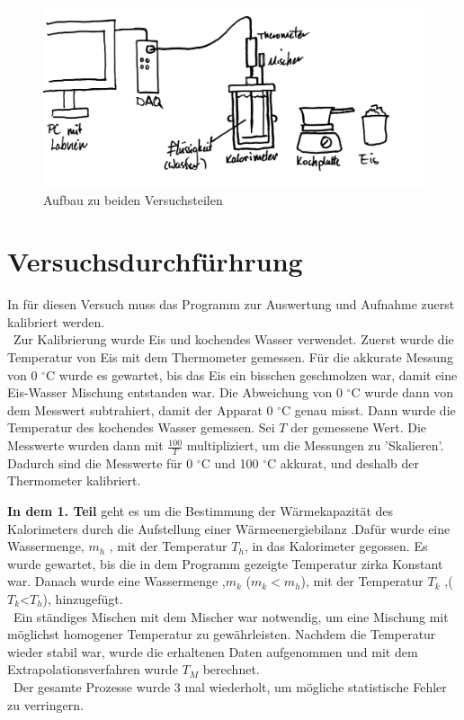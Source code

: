 \documentclass[11pt,a4paper]{article} %
\begin{document}
 
\begin{figure}
	\centering
	\includegraphics[width=\linewidth]{Abb3}
	\caption{Aufbau zu beiden Versuchsteilen}
\end{figure}

\section{Versuchsdurchf\"urhrung}

In für diesen Versuch muss das Programm zur Auswertung und Aufnahme zuerst kalibriert werden.
\\\
Zur Kalibrierung wurde Eis und kochendes Wasser verwendet. Zuerst wurde die Temperatur von Eis mit dem Thermometer gemessen. Für die akkurate Messung von 0 $^\circ$C wurde es gewartet, bis das Eis ein bisschen geschmolzen war, damit eine Eis-Wasser Mischung entstanden war. Die Abweichung von 0 $^\circ$C wurde dann von dem Messwert subtrahiert, damit der Apparat 0 $^\circ$C genau misst. 
Dann wurde die Temperatur des kochendes Wasser gemessen. Sei $T$ der gemessene Wert. Die Messwerte wurden dann mit $\frac{100}{T}$ multipliziert, um die Messungen zu 'Skalieren'. Dadurch sind die Messwerte für 0 $^\circ$C und 100 $^\circ$C akkurat, und deshalb der Thermometer kalibriert. 

\textbf{In dem 1. Teil } geht es um die Bestimmung der Wärmekapazität des Kalorimeters durch die Aufstellung einer Wärmeenergiebilanz .Daf\"ur wurde  eine Wassermenge, $m_h$ , 
mit der Temperatur $T_h$, in das Kalorimeter gegossen.
Es wurde gewartet, bis die in dem Programm gezeigte Temperatur zirka Konstant war. Danach wurde eine Wassermenge ,$m_k$ ($m_k < m_h$),  mit der Temperatur $T_k$ ,($T_k$<$T_h$), hinzugef\"ugt.
\\\
Ein st\"andiges Mischen mit dem Mischer war notwendig, um eine Mischung mit möglichst homogener Temperatur zu gewährleisten.
Nachdem die Temperatur wieder stabil war, wurde die erhaltenen Daten aufgenommen und mit dem Extrapolationsverfahren wurde $T_M$ berechnet. 
\\\
Der gesamte Prozesse wurde 3 mal wiederholt, um m\"ogliche statistische Fehler zu verringern. 
\end{document}
